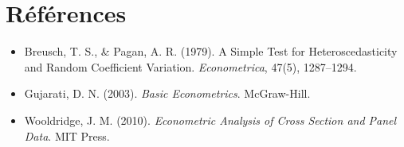 \documentclass[14pt]{extarticle} %
\theoremstyle{definition}
\theoremstyle{plain}
\begin{document}
\section{Références}

\begin{itemize}
    \item Breusch, T. S., \& Pagan, A. R. (1979). A Simple Test for Heteroscedasticity and Random Coefficient Variation. \textit{Econometrica}, 47(5), 1287–1294.
    \item Gujarati, D. N. (2003). \textit{Basic Econometrics}. McGraw-Hill.
    \item Wooldridge, J. M. (2010). \textit{Econometric Analysis of Cross Section and Panel Data}. MIT Press.
\end{itemize}
\end{document}
